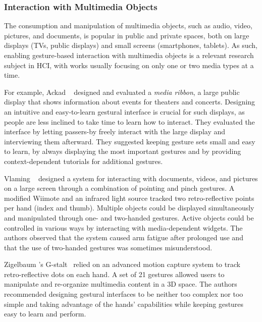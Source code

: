 \subsubsection{Interaction with Multimedia Objects}
The consumption and manipulation of multimedia objects, such as audio, video, pictures, and documents, is popular in public and private spaces, both on large displays (\eg TVs, public displays) and small screens (\eg smartphones, tablets). 
%
As such, enabling gesture-based interaction with multimedia objects is a relevant research subject in HCI, with works usually focusing on only one or two media types at a time.

For example, Ackad \etal~\cite{Ackad:2015} designed and evaluated a \textit{media ribbon}, a large public display that shows information about events for theaters and concerts. Designing an intuitive and easy-to-learn gestural interface is crucial for such displays, as people are less inclined to take time to learn how to interact. They evaluated the interface by letting passers-by freely interact with the large display and interviewing them afterward. They suggested keeping gesture sets small and easy to learn, \eg by always displaying the most important gestures and by providing context-dependent tutorials for additional gestures.

Vlaming \etal~\cite{Vlaming:2008} designed a system for interacting with documents, videos, and pictures on a large screen through a combination of pointing and pinch gestures. A modified Wiimote and an infrared light source tracked two retro-reflective points per hand (index and thumb). Multiple objects could be displayed simultaneously and manipulated through one- and two-handed gestures. Active objects could be controlled in various ways by interacting with media-dependent widgets. The authors observed that the system caused arm fatigue after prolonged use and that the use of two-handed gestures was sometimes misunderstood. 

Zigelbaum \etal's G-stalt~\cite{Zigelbaum:2010} relied on an advanced motion capture system to track retro-reflective dots on each hand. A set of 21 gestures allowed users to manipulate and re-organize multimedia content in a 3D space. The authors recommended designing gestural interfaces to be neither too complex nor too simple and taking advantage of the hands' capabilities while keeping gestures easy to learn and perform.

